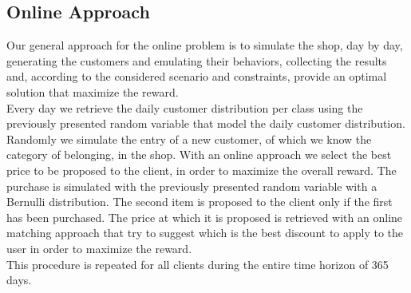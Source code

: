 \subsection*{Online Approach}
Our general approach for the online problem is to simulate the shop, day by day, generating the customers and emulating their behaviors, collecting the results and, according to the considered scenario and constraints, provide an optimal solution that maximize the reward.\\
Every day we retrieve the daily customer distribution per class using the previously presented random variable that model the daily customer distribution. Randomly we simulate the entry of a new customer, of which we know the category of belonging, in the shop. With an online approach we select the best price to be proposed to the client, in order to maximize the overall reward. The purchase is simulated with the previously presented random variable with a Bernulli distribution.
The second item is proposed to the client only if the first has been purchased. The price at which it is proposed is retrieved with an online matching approach that try to suggest which is the best discount to apply to the user in order to maximize the reward.\\
This procedure is repeated for all clients during the entire time horizon of 365 days. 
